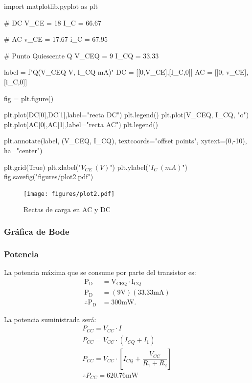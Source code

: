 \documentclass[a4paper, 12pt]{article}
\begin{document}
\begin{pycode}
import matplotlib.pyplot as plt

# DC
V_CE = 18 
I_C = 66.67 

# AC
v_CE = 17.67 
i_C = 67.95

# Punto Quiescente Q
V_CEQ = 9
I_CQ = 33.33

label = f"Q({V_CEQ} V, {I_CQ} mA)"
DC = [[0,V_CE],[I_C,0]]
AC = [[0, v_CE], [i_C,0]]

fig = plt.figure()

plt.plot(DC[0],DC[1],label="recta DC")
plt.legend()
plt.plot(V_CEQ, I_CQ, "o")
plt.plot(AC[0],AC[1],label="recta AC")
plt.legend()

plt.annotate(label, (V_CEQ, I_CQ), 
textcoords="offset points", xytext=(0,-10), ha="center")

plt.grid(True)
plt.xlabel("$V_{CE}\ (V)$")
plt.ylabel("$I_{C}\ (mA)$")
fig.savefig("figures/plot2.pdf")
\end{pycode}

\begin{figure}[H]
    \centering
    \texttt{[image: figures/plot2.pdf]}
    \caption{Rectas de carga en AC y DC}
\end{figure}

\subsubsection{Gráfica de Bode}

\subsubsection{Potencia}
La potencia máxima que se consume por parte del transistor es:
\begin{align*}
    \text{P}_\text{D} &= \text{V}_{\text{CEQ}}\cdot \text{I}_{\text{CQ}} \\
    \text{P}_\text{D} &= (9\text{V})(33.33 \text{mA}) \\
    \therefore \text{P}_\text{D} &= 300 \text{mW}.
\end{align*}

La potencia suministrada será:
\begin{align*}
    P_{CC} = V_{CC}\cdot I\\
    P_{CC} = V_{CC}\cdot (I_{CQ} + I_1)\\
    P_{CC} = V_{CC}\cdot \left[I_{CQ} + \dfrac{V_{CC}}{R_1 + R_2}\right]\\[1.5mm]
    \therefore P_{CC} = 620.76 \text{mW}
\end{align*}
\end{document}
